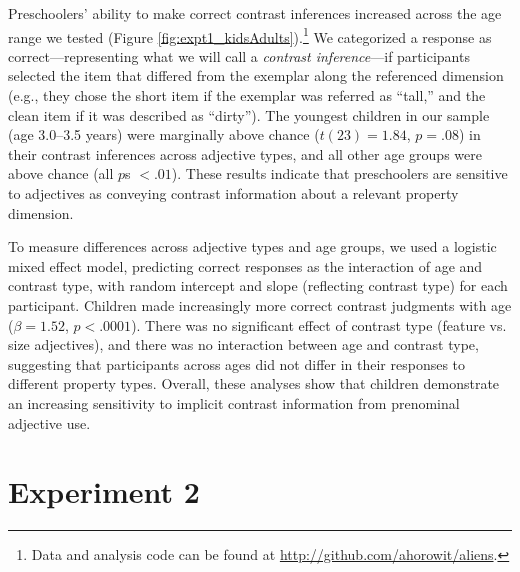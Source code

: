 \documentclass[man]{apa2}
\begin{document}
Preschoolers' ability to make correct contrast inferences increased across the age range we tested (Figure \ref{fig:expt1_kidsAdults}).\footnote{Data and analysis code can be found at \url{http://github.com/ahorowit/aliens}.} We categorized a response as correct---representing what we will call a \emph{contrast inference}---if participants selected the item that differed from the exemplar along the referenced dimension (e.g., they chose the short item if the exemplar was referred as ``tall,'' and the clean item if it was described as ``dirty'').  The youngest children in our sample (age 3.0--3.5 years) were marginally above chance ($t(23) = 1.84$, $p = .08$) in their contrast inferences across adjective types, and all other age groups were above chance (all $p$s $< .01$). These results indicate that preschoolers are sensitive to adjectives as conveying contrast information about a relevant property dimension.



To measure differences across adjective types and age groups, we used a logistic mixed effect model, predicting correct responses as the interaction of age and contrast type, with random intercept and slope (reflecting contrast type) for each participant.  Children made increasingly more correct contrast judgments with age ($\beta = 1.52$, $p < .0001$). There was no significant effect of contrast type (feature vs. size adjectives), and there was no interaction between age and contrast type, suggesting that participants across ages did not differ in their responses to different property types.  Overall, these analyses show that children demonstrate an increasing sensitivity to implicit contrast information from prenominal adjective use.  





\section{Experiment 2}
\end{document}
